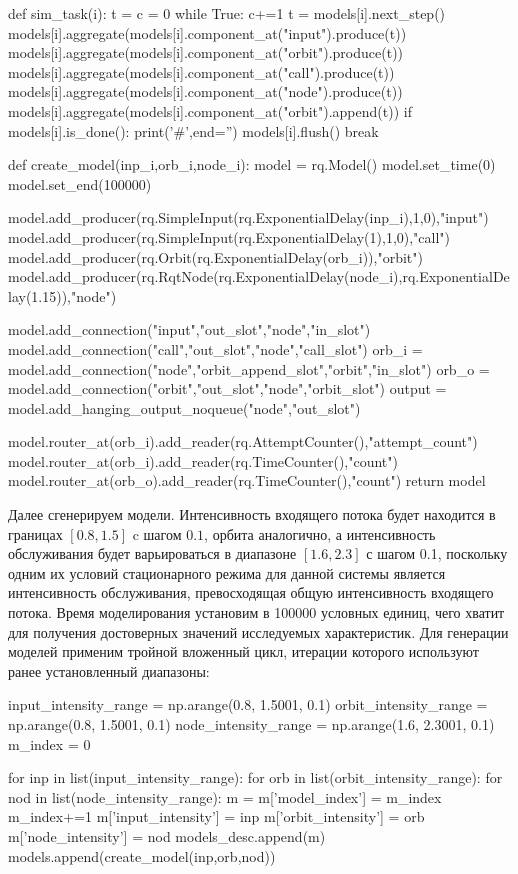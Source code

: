 \begin{pyin} 
def sim_task(i):
   t = c = 0
   while True:
      c+=1 
      t = models[i].next_step()
      models[i].aggregate(models[i].component_at("input").produce(t))
      models[i].aggregate(models[i].component_at("orbit").produce(t))
      models[i].aggregate(models[i].component_at("call").produce(t))
      models[i].aggregate(models[i].component_at("node").produce(t))
      models[i].aggregate(models[i].component_at("orbit").append(t))
      if models[i].is_done():
         print('#',end='')
         models[i].flush()
         break
\end{pyin}         

\begin{pyin}
def create_model(inp_i,orb_i,node_i):
model = rq.Model()
model.set_time(0) 
model.set_end(100000)

model.add_producer(rq.SimpleInput(rq.ExponentialDelay(inp_i),1,0),"input")
model.add_producer(rq.SimpleInput(rq.ExponentialDelay(1),1,0),"call")
model.add_producer(rq.Orbit(rq.ExponentialDelay(orb_i)),"orbit")
model.add_producer(rq.RqtNode(rq.ExponentialDelay(node_i),rq.ExponentialDelay(1.15)),"node")

model.add_connection("input","out_slot","node","in_slot")
model.add_connection("call","out_slot","node","call_slot")
orb_i = model.add_connection("node","orbit_append_slot","orbit","in_slot")
orb_o = model.add_connection("orbit","out_slot","node","orbit_slot")
output = model.add_hanging_output_noqueue("node","out_slot")

model.router_at(orb_i).add_reader(rq.AttemptCounter(),"attempt_count")
model.router_at(orb_i).add_reader(rq.TimeCounter(),"count")
model.router_at(orb_o).add_reader(rq.TimeCounter(),"count")
return model
\end{pyin}


Далее сгенерируем модели. Интенсивность входящего потока будет находится в границах $[0.8,1.5]$ c шагом $0.1$, орбита аналогично, а интенсивность обслуживания будет варьироваться в диапазоне $[1.6,2.3]$ с шагом 0.1, поскольку одним их условий стационарного режима для данной системы является интенсивность обслуживания, превосходящая общую интенсивность входящего потока. Время моделирования установим в 100000 условных единиц, чего хватит для получения достоверных значений исследуемых характеристик. Для генерации моделей применим тройной вложенный цикл, итерации которого используют ранее установленный диапазоны:
\begin{pyin} 
input_intensity_range = np.arange(0.8, 1.5001, 0.1)
orbit_intensity_range = np.arange(0.8, 1.5001, 0.1)
node_intensity_range = np.arange(1.6, 2.3001, 0.1)
m_index = 0

for inp in list(input_intensity_range):
for orb in list(orbit_intensity_range):
for nod in list(node_intensity_range):
   m = {}
   m['model_index'] = m_index
   m_index+=1
   m['input_intensity'] = inp
   m['orbit_intensity'] = orb
   m['node_intensity'] = nod
   models_desc.append(m)
   models.append(create_model(inp,orb,nod))
\end{pyin}

